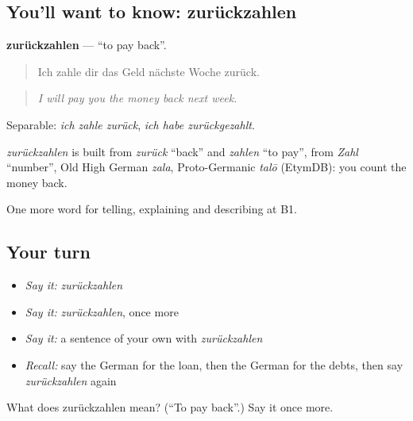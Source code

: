 \subsection*{You'll want to know: zurückzahlen}
\textbf{zurückzahlen} — \textquotedblleft{}to pay back\textquotedblright{}.

\begin{quote}
Ich zahle dir das Geld nächste Woche zurück.
\end{quote}

\begin{quote}
\emph{I will pay you the money back next week.}
\end{quote}

Separable: \emph{ich zahle zurück}, \emph{ich habe zurückgezahlt}.

\begin{cousinweb}
\emph{zurückzahlen} is built from \emph{zurück} \textquotedblleft{}back\textquotedblright{} and \emph{zahlen} \textquotedblleft{}to pay\textquotedblright{}, from \emph{Zahl} \textquotedblleft{}number\textquotedblright{}, Old High German \emph{zala}, Proto-Germanic \emph{talō} (EtymDB): you count the money back.
\end{cousinweb}

\begin{grammarlens}[title={What you've built}]
One more word for telling, explaining and describing at B1.
\end{grammarlens}

\subsection*{Your turn}
\begin{itemize}
\raggedright
  \item \emph{Say it:} \emph{zurückzahlen}
  \item \emph{Say it:} \emph{zurückzahlen}, once more
  \item \emph{Say it:} a sentence of your own with \emph{zurückzahlen}
  \item \emph{Recall:} say the German for the loan, then the German for the debts, then say \emph{zurückzahlen} again
\end{itemize}

\begin{tcolorbox}[breakable,colback=teal!4,colframe=teal!35!black,title={Before you move on}]
What does zurückzahlen mean? (\textquotedblleft{}To pay back\textquotedblright{}.) Say it once more.
\end{tcolorbox}
